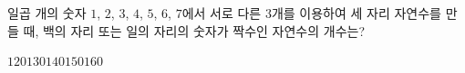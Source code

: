 \hspace*{2mm}\begin{minipage}[t]{\dimexpr\linewidth-2mm\relax}\vspace{0pt}
일곱 개의 숫자 $1$, $2$, $3$, $4$, $5$, $6$, $7$에서 서로 다른 $3$개를 이용하여 세 자리 자연수를 만들 때, 백의 자리 또는 일의 자리의 숫자가 짝수인 자연수의 개수는?
\begin{choices32}{$120$}{$130$}{$140$}{$150$}{$160$}\end{choices32}\end{minipage}
